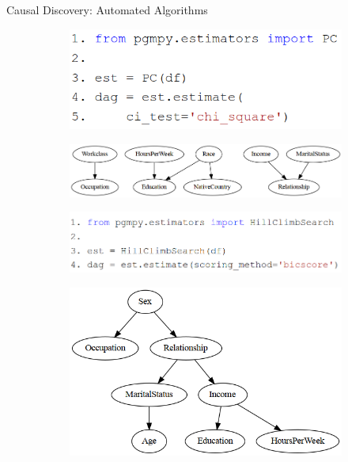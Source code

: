 \documentclass{beamer}
\begin{document}
\begin{frame}{Causal Discovery: Automated Algorithms}
	\begin{figure}
		\begin{subfigure}{0.45 \textwidth}
			\includegraphics[scale=0.28]{imgs/pc_chisquare.png}
		\end{subfigure}%
		\begin{subfigure}{0.55 \textwidth}
			\includegraphics[scale=0.25]{imgs/adult_x2.png}
		\end{subfigure}\vfill
		\begin{subfigure}{0.6 \textwidth}
			\includegraphics[scale=0.28]{imgs/hill_bic.png}
		\end{subfigure}%
		\begin{subfigure}{0.4 \textwidth}
			\includegraphics[scale=0.25]{imgs/adult_bic.png}
		\end{subfigure}
	\end{figure}
\end{frame}
\end{document}
